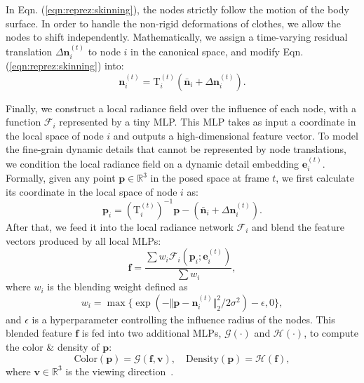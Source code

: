 In Eqn. (\ref{eqn:reprez:skinning}), the nodes strictly follow the motion of the body surface. In order to handle the non-rigid deformations of clothes, we allow the nodes to shift independently. Mathematically, we assign a time-varying residual translation $\Delta\bm{n}_i^{(t)}$ to node $i$  in the canonical space, and modify Eqn. (\ref{eqn:reprez:skinning}) into:
\begin{equation}
\label{eqn:reprez:skinning_2}
    \bm{n}_i^{(t)} = \bm{\mathrm{T}}_i^{(t)} \left(\bm{\bar{n}}_i + \Delta\bm{n}_i^{(t)}\right).
\end{equation}

Finally, we construct a local radiance field over the influence of each node, with a function $\mathcal{F}_i$ represented by a tiny MLP. This MLP takes as input a coordinate in the local space of node $i$ and outputs a high-dimensional feature vector. To model the fine-grain dynamic details that cannot be represented by node translations, we condition the local radiance field on a dynamic detail embedding $\bm{e}_i^{(t)}$. Formally, given any point $\bm{p}\in\mathbb{R}^3$ in the posed space at frame $t$, we first calculate its coordinate in the local space of node $i$ as:
\begin{equation}
\label{eqn:reprez:local_coord}
    \bm{p}_i = \left(\bm{\mathrm{T}}_i^{(t)}\right)^{-1} \bm{p} - \left(\bm{\bar{n}}_i + \Delta\bm{n}_i^{(t)}\right). 
\end{equation}
After that, we feed it into the local radiance network $\mathcal{F}_i$ and blend the feature vectors produced by all local MLPs:
\begin{equation}
\label{eqn:reprez:feat_fusion}
    \bm{f} = \frac{\sum w_i \mathcal{F}_i(\bm{p}_i; \bm{e}_i^{(t)})}{\sum w_i},  
\end{equation}
where $w_i$ is the blending weight defined as
\begin{equation}
\label{eqn:reprez:blending_weight}
    w_i = \max \{\exp (-\Vert\bm{p} - \bm{n}_i^{(t)}\Vert_2^2 / 2\sigma^2) - \epsilon, 0\}, 
\end{equation}
and $\epsilon$ is a hyperparameter controlling the influence radius of the nodes.
This blended feature $\bm{f}$ is fed into two additional MLPs, $\mathcal{G}(\cdot)$ and $\mathcal{H}(\cdot)$, to compute the color \& density of $\bm{p}$:
\begin{equation}
\label{eqn:reprez:color_density}
    \mathrm{Color}(\bm{p}) = \mathcal{G}(\bm{f}, \bm{v}), \quad \mathrm{Density}(\bm{p}) = \mathcal{H}(\bm{f}), 
\end{equation}
where $\bm{v}\in\mathbb{R}^3$ is the viewing direction~\cite{mildenhall2020nerf}. 

